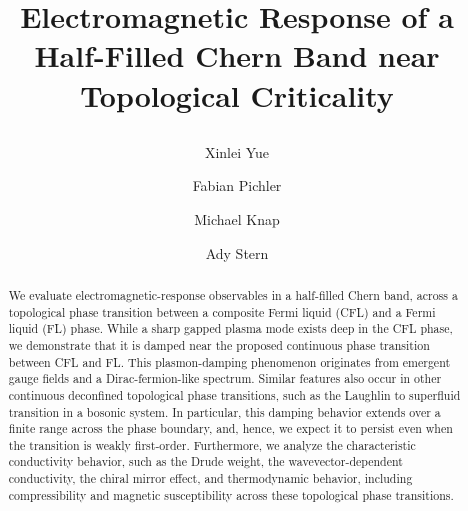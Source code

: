 \documentclass[aps,prl,twocolumn,superscriptaddress,floatfix, 10pt,longbibliography, nofootinbib]{revtex4-2}
\begin{document}
\title{






Electromagnetic Response of a Half-Filled Chern Band near Topological Criticality
}

\author{Xinlei Yue}
\author{Fabian Pichler}
\author{Michael Knap}
\author{Ady Stern}
\begin{abstract}
We evaluate electromagnetic-response observables in a half-filled Chern band, across a topological phase transition between a composite Fermi liquid (CFL) and a Fermi liquid (FL) phase. While a sharp gapped plasma mode exists deep in the CFL phase, we demonstrate that it is damped near the proposed continuous phase transition between CFL and FL. This plasmon-damping phenomenon originates from emergent gauge fields and a Dirac-fermion-like spectrum. Similar features also occur in other continuous deconfined topological phase transitions, such as the Laughlin to superfluid transition in a bosonic system. In particular, this damping behavior extends over a finite range across the phase boundary, and, hence, we expect it to persist even when the transition is weakly first-order. Furthermore, we analyze the characteristic conductivity behavior, such as the Drude weight, the wavevector-dependent conductivity,  the chiral mirror effect, and thermodynamic behavior, including compressibility and magnetic susceptibility across these topological phase transitions.
\end{abstract}
\maketitle
\end{document}
